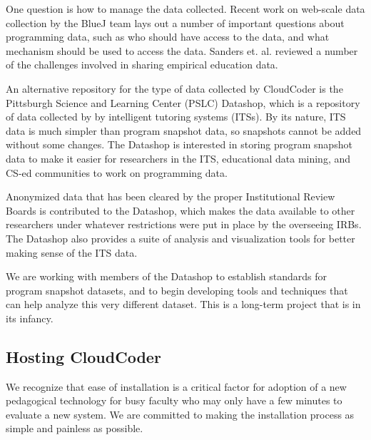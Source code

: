 \documentclass{sig-alternate}
\begin{document}
One question is how to manage the data collected.  
Recent work on web-scale data collection by the BlueJ team
\cite{Utting:2012:WDG:2361276.2361278} lays out a number of important
questions about programming data, such as who should have access to the data, and what
mechanism should be used to access the data.  Sanders
et. al. \cite{Sanders:2008:DSE:1404520.1404534} reviewed a number of
the challenges involved in sharing empirical education data.  

An alternative repository for the type of data collected by CloudCoder
is the Pittsburgh Science and Learning Center (PSLC) Datashop, which
is a repository of data collected by by intelligent tutoring
systems (ITSs).  By its nature, ITS data is much simpler than program
snapshot data, so snapshots cannot be added without some changes.
The Datashop is interested in storing program
snapshot data to make it easier for researchers in the ITS, educational data
mining, and CS-ed communities to work on programming data.

Anonymized data that has been cleared by the proper Institutional
Review Boards is contributed to the Datashop, which
makes the data available to other researchers under whatever
restrictions were put in place by the overseeing IRBs.  The Datashop also
provides a suite of analysis and visualization tools for better making
sense of the ITS data.

We are working with members of the Datashop to establish standards for
program snapshot datasets, and to begin developing tools and
techniques that can help analyze this very different dataset.  This is
a long-term project that is in its infancy.





\subsection{Hosting CloudCoder}
We recognize that ease of installation is a critical factor for
adoption of a new pedagogical
technology for busy
faculty who may only have a few minutes to evaluate a new system.  We
are committed to making the installation process as simple and painless as 
possible.
\end{document}
